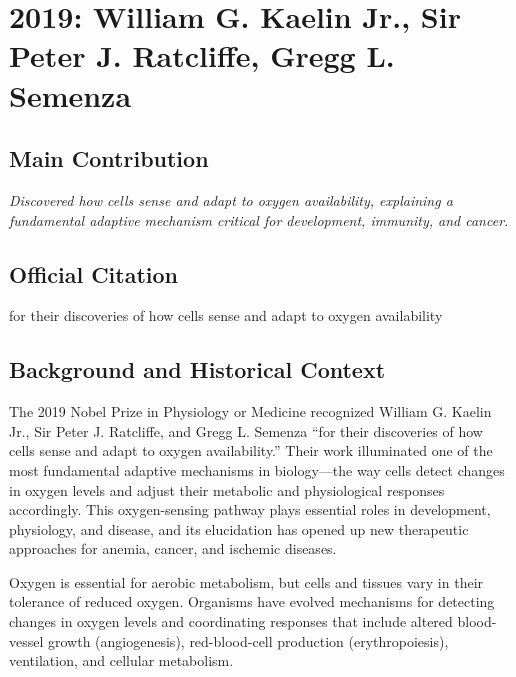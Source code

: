\chapter[2019 --- Jr. et al.]{2019: William G. Kaelin Jr., Sir Peter J. Ratcliffe, Gregg L. Semenza}
\label{ch:2019_Kaelin}

\section*{Main Contribution}

\textit{Discovered how cells sense and adapt to oxygen availability, explaining a fundamental adaptive mechanism critical for development, immunity, and cancer.}\cite{nobel-2019,lecture-2019}

\section{Official Citation}

for their discoveries of how cells sense and adapt to oxygen availability

\section{Background and Historical Context}

The 2019 Nobel Prize in Physiology or Medicine recognized William G. Kaelin Jr., Sir Peter J. Ratcliffe, and Gregg L. Semenza ``for their discoveries of how cells sense and adapt to oxygen availability.'' Their work illuminated one of the most fundamental adaptive mechanisms in biology---the way cells detect changes in oxygen levels and adjust their metabolic and physiological responses accordingly. This oxygen-sensing pathway plays essential roles in development, physiology, and disease, and its elucidation has opened up new therapeutic approaches for anemia, cancer, and ischemic diseases.

Oxygen is essential for aerobic metabolism, but cells and tissues vary in their tolerance of reduced oxygen. Organisms have evolved mechanisms for detecting changes in oxygen levels and coordinating responses that include altered blood-vessel growth (angiogenesis), red-blood-cell production (erythropoiesis), ventilation, and cellular metabolism.

